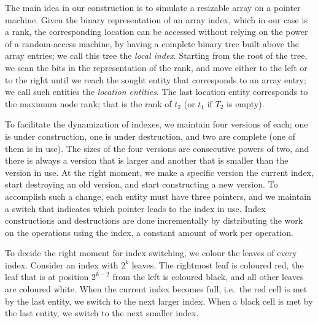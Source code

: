 \documentclass{llncs}
\begin{document}
The main idea in our construction is to simulate a resizable array on
a pointer machine.  Given the binary representation of an array index,
which in our case is a rank, the corresponding location can be
accessed without relying on the power of a random-access machine, by
having a complete binary tree built above the array entries;
we call this tree the \emph{local index}. 
Starting from the root of the tree, we scan the bits in the representation of
the rank, and move either to the left or to the right until we reach
the sought entity that corresponds to an array entry; 
we call such entities the \emph{location entities}.   
The last location entity corresponds to the maximum node rank;
that is the rank of $t_2$ (or $t_1$ if $T_2$ is empty).

To facilitate the dynamization of indexes, we maintain four versions of
each; one is under construction, one is under destruction, and two are
complete (one of them is in use).  The sizes of the four versions are
consecutive powers of two, and there is always a version that is
larger and another that is smaller than the version in use.  At the
right moment, we make a specific version the current index, start
destroying an old version, and start constructing a new version.  To
accomplish such a change, each entity must
have three pointers, and we maintain a switch that indicates which
pointer leads to the index in use.  Index constructions and
destructions are done incrementally by distributing the work on the
operations using the index, a constant amount of work per operation.

To decide the right moment for index switching, we colour the leaves of 
every index. Consider an index with $2^k$ leaves. The rightmost leaf
is coloured red, the leaf that is at position $2^{k-2}$ from the left is coloured black, 
and all other leaves are coloured white.  
When the current index becomes full, i.e.~the red cell is met
by the last entity, we switch to the next larger index. When a
black cell is met by the last entity, we switch to the next smaller index. 
\end{document}

